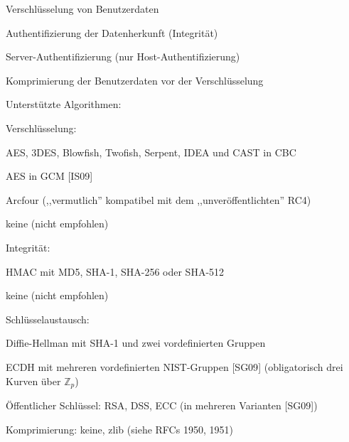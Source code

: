 \documentclass[a4paper]{article}
\begin{document}
\begin{multicols}{3}
\begin{itemize*}
\begin{itemize*}
                  \begin{itemize*}
                        \item Verschlüsselung von Benutzerdaten
                        \item Authentifizierung der Datenherkunft (Integrität)
                        \item Server-Authentifizierung (nur Host-Authentifizierung)
                        \item Komprimierung der Benutzerdaten vor der Verschlüsselung
                  \end{itemize*}
                  \item
                  Unterstützte Algorithmen:

                  \begin{itemize*}
                        \item Verschlüsselung:
                        \begin{itemize*} \item AES, 3DES, Blowfish, Twofish, Serpent, IDEA und CAST in CBC \item AES in GCM {[}IS09{]} \item Arcfour (,,vermutlich'' kompatibel mit dem ,,unveröffentlichten'' RC4) \item keine (nicht empfohlen) \end{itemize*}
                        \item Integrität:
                        \begin{itemize*} \item HMAC mit MD5, SHA-1, SHA-256 oder SHA-512 \item keine (nicht empfohlen) \end{itemize*}
                        \item Schlüsselaustausch:
                        \begin{itemize*} \item Diffie-Hellman mit SHA-1 und zwei vordefinierten Gruppen \item ECDH mit mehreren vordefinierten NIST-Gruppen {[}SG09{]} (obligatorisch drei Kurven über $\mathbb{Z}_p$) \item Öffentlicher Schlüssel: RSA, DSS, ECC (in mehreren Varianten {[}SG09{]}) \end{itemize*}
                        \item Komprimierung: keine, zlib (siehe RFCs 1950, 1951)
                  \end{itemize*}
            \end{itemize*}



\end{itemize*}
\end{multicols}
\end{document}
